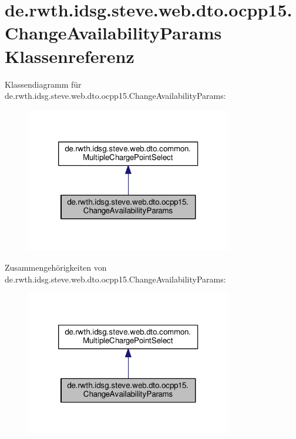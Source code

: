 \hypertarget{classde_1_1rwth_1_1idsg_1_1steve_1_1web_1_1dto_1_1ocpp15_1_1_change_availability_params}{\section{de.\-rwth.\-idsg.\-steve.\-web.\-dto.\-ocpp15.\-Change\-Availability\-Params Klassenreferenz}
\label{classde_1_1rwth_1_1idsg_1_1steve_1_1web_1_1dto_1_1ocpp15_1_1_change_availability_params}
}


Klassendiagramm für de.\-rwth.\-idsg.\-steve.\-web.\-dto.\-ocpp15.\-Change\-Availability\-Params\-:
\nopagebreak
\begin{figure}[H]
\begin{center}
\leavevmode
\includegraphics[width=256pt]{classde_1_1rwth_1_1idsg_1_1steve_1_1web_1_1dto_1_1ocpp15_1_1_change_availability_params__inherit__graph}
\end{center}
\end{figure}


Zusammengehörigkeiten von de.\-rwth.\-idsg.\-steve.\-web.\-dto.\-ocpp15.\-Change\-Availability\-Params\-:
\nopagebreak
\begin{figure}[H]
\begin{center}
\leavevmode
\includegraphics[width=256pt]{classde_1_1rwth_1_1idsg_1_1steve_1_1web_1_1dto_1_1ocpp15_1_1_change_availability_params__coll__graph}
\end{center}
\end{figure}
